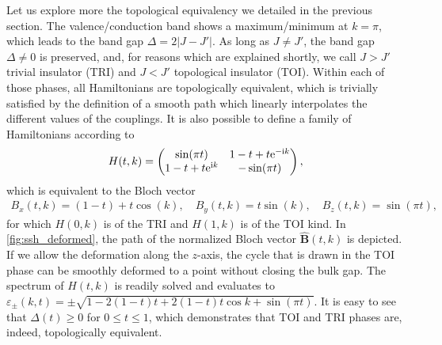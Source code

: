 Let us explore more the topological equivalency we detailed in the previous section.
The valence/conduction band shows a maximum/minimum at $k=\pi$, which leads to the band gap $\Delta = 2\left|J-J'\right|$.
As long as $J\neq J'$, the band gap $\Delta\neq0$ is preserved, and, for reasons which are explained shortly, we call $J>J'$ trivial insulator (TRI) and $J<J'$ topological insulator (TOI).
Within each of those phases, all Hamiltonians are topologically equivalent, which is trivially satisfied by the definition of a smooth path which linearly interpolates the different values of the couplings.
It is also possible to define a family of Hamiltonians according to
\begin{align}
    H(t,k) =
    \begin{pmatrix}
        \sin(\pi t) & 1-t + t\mathrm e^{-\mathrm i k} \\
        1-t + t\mathrm e^{\mathrm i k} & -\sin(\pi t)
    \end{pmatrix},
    \label{eq:hamiltonian_path}
\end{align}
which is equivalent to the Bloch vector
\begin{align}
    B_x(t,k) = (1-t)+t\cos(k),
    \quad
    B_y(t,k) = t\sin(k),
    \quad
    B_z(t,k) = \sin(\pi t),
\end{align}
for which $H(0,k)$ is of the TRI and $H(1,k)$ is of the TOI kind.
In \cref{fig:ssh_deformed}, the path of the normalized Bloch vector $\hat{\bm B}(t,k)$ is depicted.
If we allow the deformation along the $z$-axis, the cycle that is drawn in the TOI phase can be smoothly deformed to a point without closing the bulk gap.
The spectrum of $H(t,k)$ is readily solved and evaluates to $\varepsilon_\pm(k,t)=\pm\sqrt{1-2(1-t)t+2(1-t)t\cos k+\sin(\pi t)}$.
It is easy to see that $\Delta({t})\geq0$ for $0\leq t\leq1$, which demonstrates that TOI and TRI phases are, indeed, topologically equivalent.
